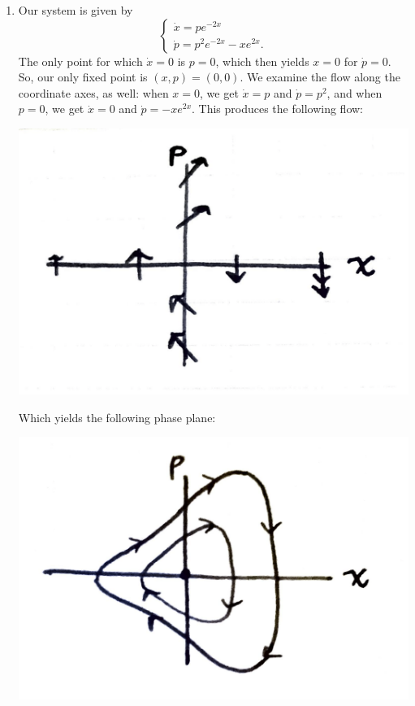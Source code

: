 \documentclass[10pt,letterpaper]{report}
\begin{document}
\begin{enumerate}
\begin{enumerate}
    \item Our system is given by
    \[
    \begin{cases}
    \dot x = pe^{-2x} \\
    \dot p = p^2e^{-2x} - xe^{2x}.
    \end{cases}
    \]
    The only point for which $\dot x = 0$ is $p = 0$, which then yields $x = 0$ for $\dot p = 0$. So, our only fixed point is $(x, p) = (0, 0)$. We examine the flow along the coordinate axes, as well: when $x = 0$, we get $\dot x = p$ and $\dot p = p^2$, and when $p = 0$, we get $\dot x = 0$ and $\dot p = -xe^{2x}$. This produces the following flow:
    
    \begin{center}
    \includegraphics[height=0.3\textwidth]{img/2016S2b1.png}
    \end{center}
    
    Which yields the following phase plane:
    
    \begin{center}
    \includegraphics[height=0.3\textwidth]{img/2016S2b2.png}
    \end{center}
\end{enumerate}


\end{enumerate}
\end{document}
